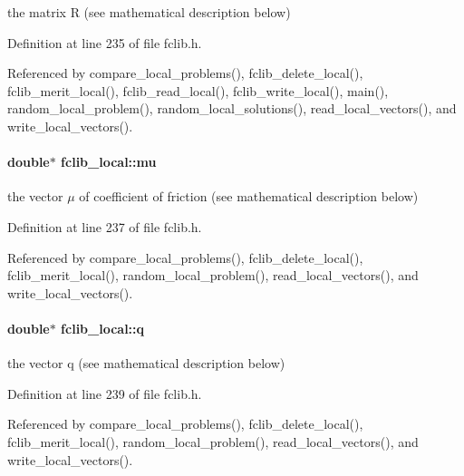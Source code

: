the matrix R (see mathematical description below) 



Definition at line 235 of file fclib.\-h.



Referenced by compare\-\_\-local\-\_\-problems(), fclib\-\_\-delete\-\_\-local(), fclib\-\_\-merit\-\_\-local(), fclib\-\_\-read\-\_\-local(), fclib\-\_\-write\-\_\-local(), main(), random\-\_\-local\-\_\-problem(), random\-\_\-local\-\_\-solutions(), read\-\_\-local\-\_\-vectors(), and write\-\_\-local\-\_\-vectors().

\hypertarget{structfclib__local_a90d9490cac0bc9b69fd13253882f1557}{
\paragraph[{mu}]{\setlength{\rightskip}{0pt plus 5cm}double$\ast$ fclib\-\_\-local\-::mu}}\label{structfclib__local_a90d9490cac0bc9b69fd13253882f1557}


the vector $\mu$ of coefficient of friction (see mathematical description below) 



Definition at line 237 of file fclib.\-h.



Referenced by compare\-\_\-local\-\_\-problems(), fclib\-\_\-delete\-\_\-local(), fclib\-\_\-merit\-\_\-local(), random\-\_\-local\-\_\-problem(), read\-\_\-local\-\_\-vectors(), and write\-\_\-local\-\_\-vectors().

\hypertarget{structfclib__local_a9a032092a828a13a7e106cce4ba7ad96}{
\paragraph[{q}]{\setlength{\rightskip}{0pt plus 5cm}double$\ast$ fclib\-\_\-local\-::q}}\label{structfclib__local_a9a032092a828a13a7e106cce4ba7ad96}


the vector q (see mathematical description below) 



Definition at line 239 of file fclib.\-h.



Referenced by compare\-\_\-local\-\_\-problems(), fclib\-\_\-delete\-\_\-local(), fclib\-\_\-merit\-\_\-local(), random\-\_\-local\-\_\-problem(), read\-\_\-local\-\_\-vectors(), and write\-\_\-local\-\_\-vectors().

